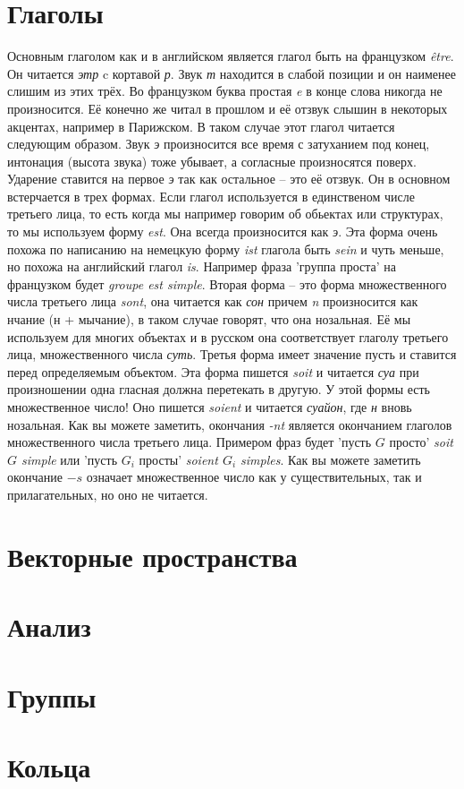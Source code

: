 \documentclass{article}
\begin{document}
\section{Глаголы}
Основным глаголом как и в английском является глагол быть на французком
\emph{être}. Он читается \emph{этр} c кортавой \emph{р}. Звук \emph{т} находится
в слабой позиции и он наименее слишим из этих трёх. Во французком буква простая
\emph{e} в конце слова никогда не произносится. Её конечно же читал в прошлом и
её отзвук слышин в некоторых акцентах, например в Парижском. В таком случае
этот глагол читается следующим образом. Звук \emph{э} произносится все время
с затуханием под конец, интонация (высота звука) тоже убывает, а согласные
произносятся поверх. Ударение ставится на первое \emph{э} так как остальное –
это её отзвук. Он в основном встерчается в трех формах. Если глагол используется
в единственом  числе третьего лица, то есть когда мы например говорим об
обьектах или структурах, то мы используем форму \emph{est}. Она всегда
произносится как \emph{э}. Эта форма очень похожа по написанию на немецкую форму
\emph{ist} глагола быть \emph{sein} и чуть меньше, но похожа на английский
глагол \emph{is}. Например фраза 'группа проста' на французком будет \emph{groupe
est simple}. Вторая форма – это форма множественного числа третьего лица
\emph{sont}, она читается как \emph{сон} причем \emph{n} произносится как нчание
(н + мычание), в таком случае говорят, что она нозальная. Её мы используем для
многих объектах и в русском она соответствует глаголу третьего лица,
множественного числа \emph{суть}. Третья форма имеет значение пусть и ставится
перед определяемым объектом. Эта форма пишется \emph{soit} и читается \emph{суа}
при произношении одна гласная должна перетекать в другую. У этой формы есть
множественное число! Оно пишется \emph{soient} и читается \emph{суайон}, где
\emph{н} вновь нозальная. Как вы можете заметить, окончания \emph{-nt} является
окончанием глаголов множественного числа третьего лица. Примером фраз будет
'пусть $G$ просто' \emph{soit $G$ simple} или 'пусть $G_i$ просты' \emph{soient
$G_i$ simples}. Как вы можете заметить окончание $-s$ означает множественное
число как у существительных, так и прилагательных, но оно не читается.

\section{Векторные пространства}
\section{Анализ}
\section{Группы}
\section{Кольца}
\end{document}
